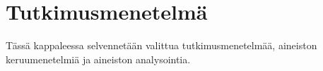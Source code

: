 \documentclass[finnish,12pt,a4paper,pdftex]{article}
\begin{document}




\clearpage

\section{Tutkimusmenetelmä}

Tässä kappaleessa selvennetään valittua tutkimusmenetelmää, aineiston keruumenetelmiä ja aineiston analysointia. 
\end{document}

